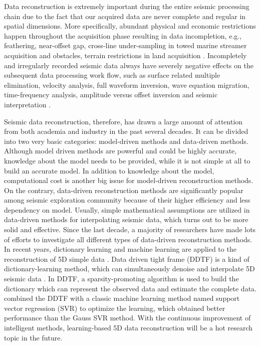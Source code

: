 Data reconstruction is extremely important during the entire seismic processing chain due to the fact that our acquired data are never complete and regular in spatial dimensions. More specifically, abundant physical and economic restrictions happen throughout the acquisition phase resulting in data incompletion, e.g., feathering, near-offset gap, cross-line under-sampling in towed marine streamer acquisition and obstacles, terrain restrictions in land acquisition \cite{ronen,spitz1991,canning1996,fomel2002pwd,fomel2003,abmapocs,herrmann2008non,mostafa2010,mostafa2013,wang2011recovery,shuwei2016cs,shaohuan2016gap,yangkang2016irr5d,amir2017ieee}. Incompletely and irregularly recorded seismic data always have severely negative effects on the subsequent data processing work flow, such as surface related multiple elimination, velocity analysis, full waveform inversion, wave equation migration, time-frequency analysis, amplitude versus offset inversion and seismic interpretation \cite{verschuure1991,shuwei20153,shuwei2016vscan,liuwei2016dealiase}.


Seismic data reconstruction, therefore, has drawn a large amount of attention from both academia and industry in the past several decades. It can be divided into two very basic categories: model-driven methods and data-driven methods. Although model driven methods are powerful and could be highly accurate,  knowledge about the model needs to be provided, while it is not simple at all to build an accurate model. In addition to  knowledge about the model, computational cost is another big issue for model-driven reconstruction methods. On the contrary, data-driven reconstruction methods are significantly popular among seismic exploration community because of their higher efficiency and less dependency on model. Usually, simple mathematical assumptions are utilized in data-driven methods for interpolating seismic data, which turns out to be more solid and effective. Since the last decade, a majority of researchers have made lots of efforts to investigate all different types of data-driven reconstruction methods. In recent years, dictionary learning and machine learning are applied to the reconstruction of 5D simple data \cite{YuSiwei2015, YuSiwei2016, Jia2017, amir2017sp,amir2017geo, Jia2018}. Data driven tight frame (DDTF) is a kind of dictionary-learning method, which can simultaneously denoise and interpolate 5D seismic data \cite{YuSiwei2015}. In DDTF, a sparsity-promoting algorithm is used to build the dictionary which can represent the observed data and estimate the complete data. \cite{Jia2017} combined the DDTF with a classic machine learning method named support vector regression (SVR) to optimize the learning, which obtained better performance than the Gauss SVR method. With the continuous improvement of intelligent methods, learning-based 5D data reconstruction will be a hot research topic in the future.

